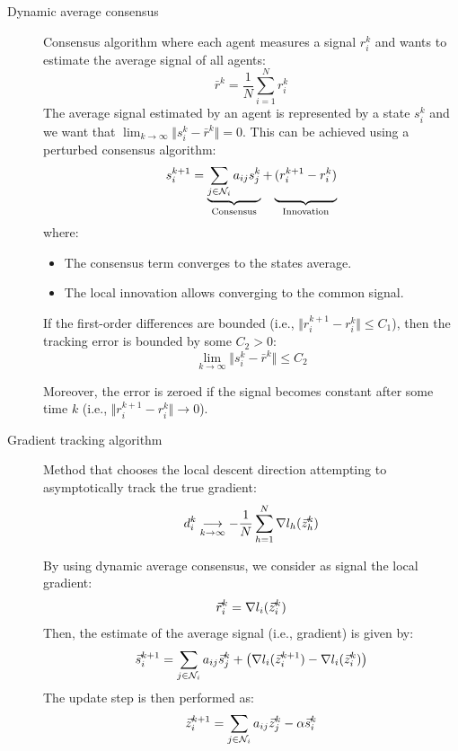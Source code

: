 \begin{description}
    \item[Dynamic average consensus] 
        Consensus algorithm where each agent measures a signal $r_i^k$ and wants to estimate the average signal of all agents:
        \[ \bar{r}^k = \frac{1}{N} \sum_{i=1}^{N} r_i^k \]
        The average signal estimated by an agent is represented by a state $s_i^k$ and we want that $\lim_{k \rightarrow \infty} \Vert s_i^k - \bar{r}^k \Vert = 0$. This can be achieved using a perturbed consensus algorithm:
        \[ 
            s_i^{k+1} = 
            \underbrace{\sum_{j \in \mathcal{N}_i} a_{ij} s_j^k}_{\text{Consensus}} +
            \underbrace{\vphantom{\sum_{j \in \mathcal{N}_i}}(r_i^{k+1} - r_i^k)}_{\text{Innovation}}
        \]
        where:
        \begin{itemize}
            \item The consensus term converges to the states average.
            \item The local innovation allows converging to the common signal.
        \end{itemize}

        \begin{theorem}
            If the first-order differences are bounded (i.e., $\Vert r_i^{k+1} - r_i^{k} \Vert \leq C_1$), then the tracking error is bounded by some $C_2 > 0$:
            \[ \lim_{k \rightarrow \infty} \Vert s_i^k - \bar{r}^k \Vert \leq C_2 \]

            Moreover, the error is zeroed if the signal becomes constant after some time $k$ (i.e., $\Vert r_i^{k+1} - r_i^{k} \Vert \rightarrow 0$).
        \end{theorem}

    \item[Gradient tracking algorithm] 
        Method that chooses the local descent direction attempting to asymptotically track the true gradient:
        \[ d_i^k \underset{k \rightarrow \infty}{\longrightarrow} - \frac{1}{N} \sum_{h=1}^N \nabla l_h({\vec{z}}_h^k) \] 

        By using dynamic average consensus, we consider as signal the local gradient:
        \[ \vec{r}_i^k = \nabla l_i({\vec{z}}_i^k) \]
        Then, the estimate of the average signal (i.e., gradient) is given by:
        \[
            \vec{s}_i^{k+1} = \sum_{j \in \mathcal{N}_i} a_{ij} \vec{s}_j^k + \left( \nabla l_i({\vec{z}}_i^{k+1}) - \nabla l_i({\vec{z}}_i^k) \right)
        \]
        The update step is then performed as:
        \[ {\vec{z}}_i^{k+1} = \sum_{j \in \mathcal{N}_i} a_{ij} {\vec{z}}_j^k - \alpha \vec{s}_i^k \]



\end{description}